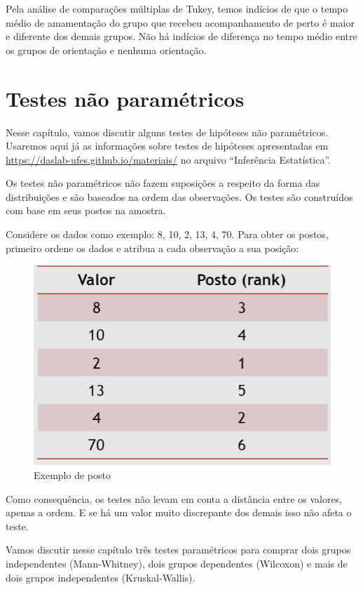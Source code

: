 \documentclass[
]{book}
\begin{document}
Pela análise de comparações múltiplas de Tukey, temos indícios de que o tempo médio de amamentação do grupo que recebeu acompanhamento de perto é maior e diferente dos demais grupos. Não há indícios de diferença no tempo médio entre os grupos de orientação e nenhuma orientação.

\hypertarget{nparam}{%
\chapter{Testes não paramétricos}\label{nparam}}

Nesse capítulo, vamos discutir alguns testes de hipóteses não paramétricos.
Usaremos aqui já as informações sobre testes de hipóteses apresentadas em \url{https://daslab-ufes.github.io/materiais/} no arquivo ``Inferência Estatística''.

Os testes não paramétricos não fazem suposições a respeito da forma das distribuições e são baseados na ordem das observações. Os testes são construídos com base em seus postos na amostra.

Considere os dados como exemplo: 8, 10, 2, 13, 4, 70. Para obter os postos, primeiro ordene os dados e atribua a cada observação a sua posição:

\begin{figure}
\includegraphics[width=0.8\linewidth]{figures/exemplo_posto} \caption{Exemplo de posto}\label{fig:unnamed-chunk-186}
\end{figure}

Como consequência, os testes não levam em conta a distância entre os valores, apenas a ordem. E se há um valor muito discrepante dos demais isso não afeta o teste.

Vamos discutir nesse capítulo três testes paramétricos para comprar dois grupos independentes (Mann-Whitney), dois grupos dependentes (Wilcoxon) e mais de dois grupos independentes (Kruskal-Wallis).
\end{document}

